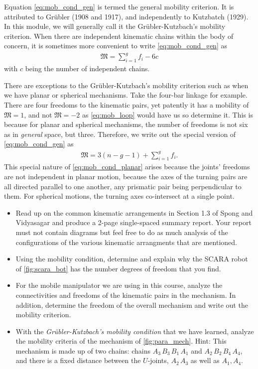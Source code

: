 Equation \eqref{eq:mob_cond_gen} is termed the general mobility criterion. It is attributed to Gr\"ubler (1908 and 1917), and independently to Kutzbatch (1929). In this module, we will generally call it the Gr\"ubler-Kutzbach's mobility criterion. When there are independent kinematic chains within the body of concern, it is sometimes more convenient to write \eqref{eq:mob_cond_gen} as 
%
\begin{align}
	\mathfrak{M} = \sum_{i=1}^g f_i - 6c
	\label{eq:mob_loop}
\end{align}
%
with $c$ being the number of independent chains. 

There are exceptions to the Gr\"ubler-Kutzbach's mobility criterion such as when we have planar or spherical mechanisms. Take the four-bar linkage for example. There are four freedoms to the kinematic pairs, yet patently it has a mobility of $\mathfrak{M}=1$, and not $\mathfrak{M}=-2$ as \eqref{eq:mob_loop} would have us so determine it.  This is because for planar and spherical mechanisms, the number of freedoms is not six as in \textit{general} space, but three. Therefore, we write out the special version of \eqref{eq:mob_cond_gen} as 
%
\begin{align}
\mathfrak{M} = 3(n - g - 1) + \sum_{i=1}^{g} f_i.
\label{eq:mob_cond_planar}
\end{align}
%
This special nature of \eqref{eq:mob_cond_planar} arises because the joints' freedoms are not independent in planar motion, because the axes of the turning pairs are all directed parallel to one another, any prismatic pair being perpendicular to them. For spherical motions, the turning axes co-intersect at a single point.

\begin{homework}
	\begin{itemize}
		\item Read up on the common kinematic arrangements in Section 1.3 of Spong and Vidyasagar and produce a 2-page single-spaced summary report. Your report must not contain diagrams but feel free to do as much analysis of the configurations of the various kinematic arrangments that are mentioned.
		\item Using the mobility condition, determine and explain why the SCARA robot of \autoref{fig:scara_bot} has the number degrees of freedom that you find.
		\item For the mobile manipulator we are using in this course, analyze the connectivities and freedoms of the kinematic pairs in the mechanism. In addition, determine the freedom of the overall mechanism and write out the mobility criterion.
		\item With the \textit{{Gr\"ubler-Kutzbach's} mobility condition} that we have learned, analyze the mobility criteria of the mechanism of \autoref{fig:para_mech}. Hint: This mechanism is made up of two chains: chains $A_3\, B_3\, B_1\, A_1$ and $A_2\, B_2\, B_4\, A_4$, and there is a fixed distance between the $U$-joints, $A_2\, A_3$ as well as $A_1, A_4$.
	\end{itemize}
\end{homework}


